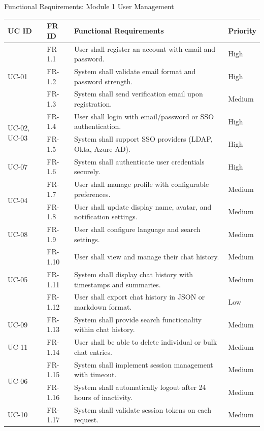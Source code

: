 \documentclass[aspectratio=169,xcolor=dvipsnames]{beamer}
\begin{document}
\begin{frame}{Functional Requirements: Module 1 User Management}
    \tiny
    \renewcommand{\arraystretch}{0.68}
    \begin{table}
        \centering
        \begin{tabular}{p{}|p{}|p{}|p{}}
        \toprule
        \textbf{UC ID} & \textbf{FR ID} & \textbf{Functional Requirements} & \textbf{Priority} \\
        \midrule
        \multirow{3}{*}{UC-01} & FR-1.1 & User shall register an account with email and password. & High \\
        & FR-1.2 & System shall validate email format and password strength. & High \\
        & FR-1.3 & System shall send verification email upon registration. & Medium \\
        \midrule
        \multirow{2}{*}{UC-02, UC-03} & FR-1.4 & User shall login with email/password or SSO authentication. & High \\
        & FR-1.5 & System shall support SSO providers (LDAP, Okta, Azure AD). & High \\
        \midrule
        UC-07 & FR-1.6 & System shall authenticate user credentials securely. & High \\
        \midrule
        \multirow{2}{*}{UC-04} & FR-1.7 & User shall manage profile with configurable preferences. & Medium \\
        & FR-1.8 & User shall update display name, avatar, and notification settings. & Medium \\
        \midrule
        UC-08 & FR-1.9 & User shall configure language and search settings. & Medium \\
        \midrule
        \multirow{3}{*}{UC-05} & FR-1.10 & User shall view and manage their chat history. & Medium \\
        & FR-1.11 & System shall display chat history with timestamps and summaries. & Medium \\
        & FR-1.12 & User shall export chat history in JSON or markdown format. & Low \\
        \midrule
        UC-09 & FR-1.13 & System shall provide search functionality within chat history. & Medium \\
        \midrule
        UC-11 & FR-1.14 & User shall be able to delete individual or bulk chat entries. & Medium \\
        \midrule
        \multirow{2}{*}{UC-06} & FR-1.15 & System shall implement session management with timeout. & Medium \\
        & FR-1.16 & System shall automatically logout after 24 hours of inactivity. & Medium \\
        \midrule
        UC-10 & FR-1.17 & System shall validate session tokens on each request. & Medium \\
        \bottomrule
        \end{tabular}
    \end{table}
\end{frame}
\end{document}

